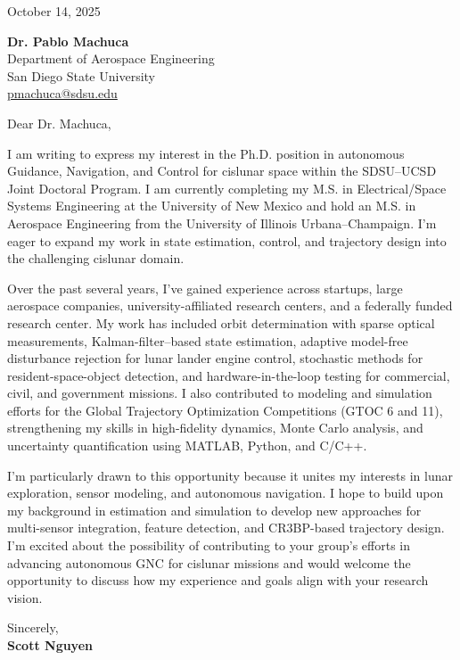 \documentclass[11pt]{article}
\begin{document}
	
	\vspace*{1.5cm}
	
	October 14, 2025
	
	\textbf{Dr. Pablo Machuca}\\
	Department of Aerospace Engineering\\
	San Diego State University\\
	\href{mailto:pmachuca@sdsu.edu}{pmachuca@sdsu.edu}
	
	Dear Dr. Machuca,
	
	I am writing to express my interest in the Ph.D. position in autonomous Guidance, Navigation, and Control for cislunar space within the SDSU--UCSD Joint Doctoral Program. I am currently completing my M.S. in Electrical/Space Systems Engineering at the University of New Mexico and hold an M.S. in Aerospace Engineering from the University of Illinois Urbana--Champaign. I’m eager to expand my work in state estimation, control, and trajectory design into the challenging cislunar domain.
	
	Over the past several years, I’ve gained experience across startups, large aerospace companies, university-affiliated research centers, and a federally funded research center. My work has included orbit determination with sparse optical measurements, Kalman-filter--based state estimation, adaptive model-free disturbance rejection for lunar lander engine control, stochastic methods for resident-space-object detection, and hardware-in-the-loop testing for commercial, civil, and government missions. I also contributed to modeling and simulation efforts for the Global Trajectory Optimization Competitions (GTOC 6 and 11), strengthening my skills in high-fidelity dynamics, Monte Carlo analysis, and uncertainty quantification using MATLAB, Python, and C/C++.
	
	I’m particularly drawn to this opportunity because it unites my interests in lunar exploration, sensor modeling, and autonomous navigation. I hope to build upon my background in estimation and simulation to develop new approaches for multi-sensor integration, feature detection, and CR3BP-based trajectory design. I’m excited about the possibility of contributing to your group’s efforts in advancing autonomous GNC for cislunar missions and would welcome the opportunity to discuss how my experience and goals align with your research vision.
	
	Sincerely,\\[1.5em]
	\textbf{Scott Nguyen}
	
\end{document}
